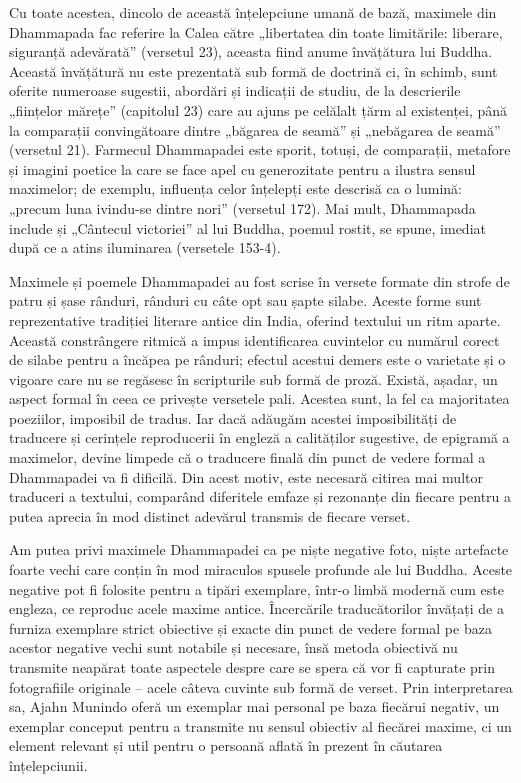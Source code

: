 Cu toate acestea, dincolo de această înțelepciune umană de bază, maximele din Dhammapada fac referire la Calea către „libertatea din toate limitările: liberare, siguranță adevărată” (versetul 23), aceasta fiind anume învățătura lui Buddha. Această învățătură nu este prezentată sub formă de doctrină ci, în schimb, sunt oferite numeroase sugestii, abordări și indicații de studiu, de la descrierile „ființelor mărețe” (capitolul 23) care au ajuns pe celălalt țărm al existenței, până la comparații convingătoare dintre „băgarea de seamă” și „nebăgarea de seamă” (versetul 21). Farmecul Dhammapadei este sporit, totuși, de comparații, metafore și imagini poetice la care se face apel cu generozitate pentru a ilustra sensul maximelor; de exemplu, influența celor înțelepți este descrisă ca o lumină: „precum luna ivindu-se dintre nori” (versetul 172). Mai mult, Dhammapada include și „Cântecul victoriei” al lui Buddha, poemul rostit, se spune, imediat după ce a atins iluminarea (versetele 153-4).

Maximele și poemele Dhammapadei au fost scrise în versete formate din strofe de patru și șase rânduri, rânduri cu câte opt sau șapte silabe. Aceste forme sunt reprezentative tradiției literare antice din India, oferind textului un ritm aparte. Această constrângere ritmică a impus identificarea cuvintelor cu numărul corect de silabe pentru a încăpea pe rânduri; efectul acestui demers este o varietate și o vigoare care nu se regăsesc în scripturile sub formă de proză. Există, așadar, un aspect formal în ceea ce privește versetele pali. Acestea sunt, la fel ca majoritatea poeziilor, imposibil de tradus. Iar dacă adăugăm acestei imposibilități de traducere și cerințele reproducerii în engleză a calităților sugestive, de epigramă a maximelor, devine limpede că o traducere finală din punct de vedere formal a Dhammapadei va fi dificilă. Din acest motiv, este necesară citirea mai multor traduceri a textului, comparând diferitele emfaze și rezonanțe din fiecare pentru a putea aprecia în mod distinct adevărul transmis de fiecare verset.

Am putea privi maximele Dhammapadei ca pe niște negative foto, niște artefacte foarte vechi care conțin în mod miraculos spusele profunde ale lui Buddha. Aceste negative pot fi folosite pentru a tipări exemplare, într-o limbă modernă cum este engleza, ce reproduc acele maxime antice. Încercările traducătorilor învățați de a furniza exemplare strict obiective și exacte din punct de vedere formal pe baza acestor negative vechi sunt notabile și necesare, însă metoda obiectivă nu transmite neapărat toate aspectele despre care se spera că vor fi capturate prin fotografiile originale – acele câteva cuvinte sub formă de verset. Prin interpretarea sa, Ajahn Munindo oferă un exemplar mai personal pe baza fiecărui negativ, un exemplar conceput pentru a transmite nu sensul obiectiv al fiecărei maxime, ci un element relevant și util pentru o persoană aflată în prezent în căutarea înțelepciunii.

